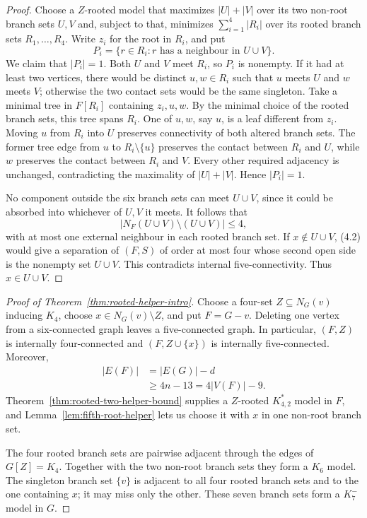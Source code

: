 \documentclass[11pt]{amsart}
\begin{document}
\begin{proof}
Choose a $Z$-rooted model that maximizes $|U|+|V|$ over its two non-root
branch sets $U,V$ and, subject to that, minimizes
$\sum_{i=1}^4|R_i|$ over its rooted branch sets $R_1,\ldots,R_4$.
Write $z_i$ for the root in $R_i$, and put
\[
        P_i=\{r\in R_i:r\text{ has a neighbour in }U\cup V\}.
\]
We claim that $|P_i|=1$.  Both $U$ and $V$ meet $R_i$, so $P_i$ is nonempty.
If it had at least two vertices, there would be distinct $u,w\in R_i$
such that $u$ meets $U$ and $w$ meets $V$; otherwise the two contact sets
would be the same singleton.  Take a minimal tree in $F[R_i]$
containing $z_i,u,w$.  By the minimal choice of the rooted branch sets, this tree
spans $R_i$.  One of $u,w$, say $u$, is a leaf different from $z_i$.
Moving $u$ from $R_i$ into $U$ preserves connectivity of both altered
branch sets.  The former tree edge from $u$ to $R_i\setminus\{u\}$ preserves the
contact between $R_i$ and $U$, while $w$ preserves the contact between
$R_i$ and $V$.  Every
other required adjacency is unchanged, contradicting the maximality of
$|U|+|V|$.  Hence $|P_i|=1$.

No component outside the six branch sets can meet $U\cup V$, since it could
be absorbed into whichever of $U,V$ it meets.  It follows that
\[
        |N_F(U\cup V)\setminus(U\cup V)|\leq4,           \tag{4.2}
\]
with at most one external neighbour in each rooted branch set.  If
$x\notin U\cup V$, (4.2) would give a separation of $(F,S)$ of order at most
four whose second open side is the nonempty set $U\cup V$.  This
contradicts internal five-connectivity.  Thus $x\in U\cup V$.
\end{proof}

\begin{proof}[Proof of Theorem~\ref{thm:rooted-helper-intro}]
Choose a four-set $Z\subseteq N_G(v)$ inducing $K_4$, choose
$x\in N_G(v)\setminus Z$, and put $F=G-v$.  Deleting one vertex from a
six-connected graph leaves a five-connected graph.  In particular,
$(F,Z)$ is internally four-connected and
$(F,Z\cup\{x\})$ is internally five-connected.  Moreover,
\[
 \begin{aligned}
 |E(F)|&=|E(G)|-d\\
       &\geq4n-13
        =4|V(F)|-9.
 \end{aligned}                                           \tag{4.3}
\]
Theorem~\ref{thm:rooted-two-helper-bound} supplies a $Z$-rooted
$K^*_{4,2}$ model in $F$, and Lemma~\ref{lem:fifth-root-helper} lets us
choose it with $x$ in one non-root branch set.

The four rooted branch sets are pairwise adjacent through the edges of
$G[Z]=K_4$.  Together with the two non-root branch sets they form a $K_6$
model.  The singleton branch set $\{v\}$ is adjacent to all four rooted
branch sets and to the one containing $x$; it may miss only the other.
These seven branch sets form a $K_7^{-}$ model in $G$.
\end{proof}
\end{document}
